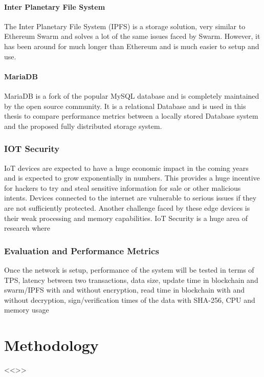 \documentclass[11pt,openright]{report}
\begin{document}
\subsubsection{Inter Planetary File System}
The Inter Planetary File System (IPFS) is a storage solution, very similar to Ethereum Swarm and solves a lot of the same issues faced by Swarm. However, it has been around for much longer than Ethereum and is much easier to setup and use.

\subsubsection{MariaDB}
MariaDB is a fork of the popular MySQL database and is completely maintained by the open source community. It is a relational Database and is used in this thesis to compare performance metrics between a locally stored Database system and the proposed fully distributed storage system.

\subsection{IOT Security}
IoT devices are expected to have a huge economic impact in the coming years and is expected to grow exponentially in numbers. This provides a huge incentive for hackers to try and steal sensitive information for sale or other malicious intents. Devices connected to the internet are vulnerable to serious issues if they are not sufficiently protected. Another challenge faced by these edge devices is their weak processing and memory capabilities. IoT Security is a huge area of research where 

\subsection{Evaluation and Performance Metrics}
Once the network is setup, performance of the system will be tested in terms of TPS, latency between two transactions, data size, update time in blockchain and swarm/IPFS with and without encryption, read time in blockchain with and without decryption, sign/verification times of the data with SHA-256, CPU and memory usage

\chapter{Methodology} \label{chapter:proposed_system}

<<>>
\end{document}
